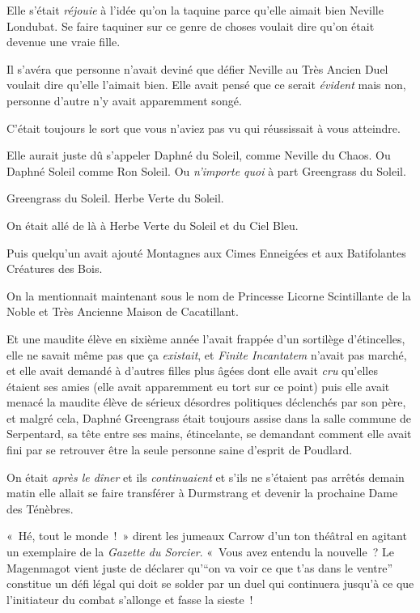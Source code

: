 Elle s'était \emph{réjouie} à l'idée qu'on la taquine parce qu'elle aimait bien Neville Londubat. Se faire taquiner sur ce genre de choses voulait dire qu'on était devenue une vraie fille.

Il s'avéra que personne n'avait deviné que défier Neville au Très Ancien Duel voulait dire qu'elle l'aimait bien. Elle avait pensé que ce serait \emph{évident} mais non, personne d'autre n'y avait apparemment songé.

C'était toujours le sort que vous n'aviez pas vu qui réussissait à vous atteindre.

Elle aurait juste dû s'appeler Daphné du Soleil, comme Neville du Chaos. Ou Daphné Soleil comme Ron Soleil. Ou \emph{n'importe quoi} à part Greengrass du Soleil.

Greengrass du Soleil. Herbe Verte du Soleil.

On était allé de là à Herbe Verte du Soleil et du Ciel Bleu.

Puis quelqu'un avait ajouté Montagnes aux Cimes Enneigées et aux Batifolantes Créatures des Bois.

On la mentionnait maintenant sous le nom de Princesse Licorne Scintillante de la Noble et Très Ancienne Maison de Cacatillant.

Et une maudite élève en sixième année l'avait frappée d'un sortilège d'étincelles, elle ne savait même pas que ça \emph{existait}, et \emph{Finite Incantatem} n'avait pas marché, et elle avait demandé à d'autres filles plus âgées dont elle avait \emph{cru} qu'elles étaient ses amies (elle avait apparemment eu tort sur ce point) puis elle avait menacé la maudite élève de sérieux désordres politiques déclenchés par son père, et malgré cela, Daphné Greengrass était toujours assise dans la salle commune de Serpentard, sa tête entre ses mains, étincelante, se demandant comment elle avait fini par se retrouver être la seule personne saine d'esprit de Poudlard.

On était \emph{après le dîner} et ils \emph{continuaient} et s'ils ne s'étaient pas arrêtés demain matin elle allait se faire transférer à Durmstrang et devenir la prochaine Dame des Ténèbres.

«~Hé, tout le monde~!~» dirent les jumeaux Carrow d'un ton théâtral en agitant un exemplaire de la \emph{Gazette du Sorcier}. «~Vous avez entendu la nouvelle~? Le Magenmagot vient juste de déclarer qu'“on va voir ce que t'as dans le ventre” constitue un défi légal qui doit se solder par un duel qui continuera jusqu'à ce que l'initiateur du combat s'allonge et fasse la sieste~!

